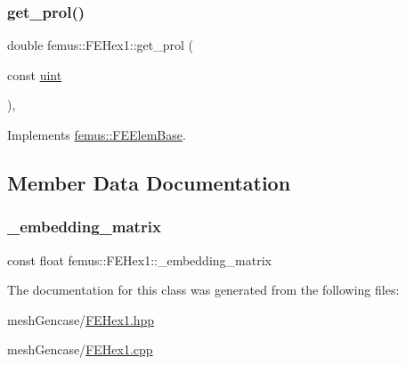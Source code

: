 \mbox{\label{classfemus_1_1_f_e_hex1_ac9745cc75964e76795dbca432939df53}} 
\subsubsection{\texorpdfstring{get\+\_\+prol()}{get\_prol()}}
{\footnotesize\ttfamily double femus\+::\+F\+E\+Hex1\+::get\+\_\+prol (\begin{DoxyParamCaption}\item[{const \mbox{\hyperlink{_typedefs_8hpp_a91ad9478d81a7aaf2593e8d9c3d06a14}{uint}}}]{ }\end{DoxyParamCaption})\hspace{0.3cm}{\ttfamily [inline]}, {\ttfamily [virtual]}}



Implements \mbox{\hyperlink{classfemus_1_1_f_e_elem_base_ac82326cdc7cb02329c7be9547d56fad4}{femus\+::\+F\+E\+Elem\+Base}}.



\subsection{Member Data Documentation}
\mbox{\label{classfemus_1_1_f_e_hex1_a8ee2980ed21bc2511602b888ad47c3ae}} 
\subsubsection{\texorpdfstring{\+\_\+embedding\+\_\+matrix}{\_embedding\_matrix}}
{\footnotesize\ttfamily const float femus\+::\+F\+E\+Hex1\+::\+\_\+embedding\+\_\+matrix\hspace{0.3cm}{\ttfamily [static]}}



The documentation for this class was generated from the following files\+:\begin{DoxyCompactItemize}
\item 
mesh\+Gencase/\mbox{\hyperlink{_f_e_hex1_8hpp}{F\+E\+Hex1.\+hpp}}\item 
mesh\+Gencase/\mbox{\hyperlink{_f_e_hex1_8cpp}{F\+E\+Hex1.\+cpp}}\end{DoxyCompactItemize}
